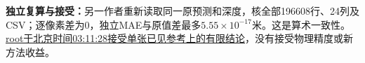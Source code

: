 \noindent\textbf{独立复算与接受：}另一作者重新读取同一原预测和深度，核全部196608行、24列及CSV；逐像素差为0，独立MAE与原值差最多$5.55\times10^{-17}$米。这是算术一致性。\href{/Users/rocket/Desktop/HKUST\%20IT/ip-/geometry-world-modeling/work/S84_anchor_depth_change/ROOT_RESULT_ACCEPTANCE.json}{root于北京时间03:11:28接受单张已见参考上的有限结论}，没有接受物理精度或新方法收益。

